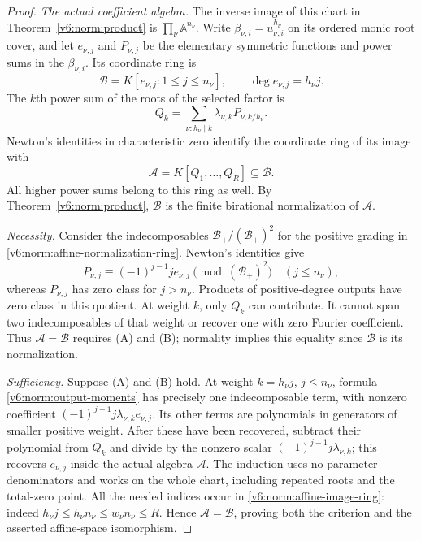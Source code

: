 \documentclass[10pt,fleqn]{article}
\numberwithin{equation}{section}
\newcommand{\A}{\mathbb A}
\begin{document}
\begin{proof}
\emph{The actual coefficient algebra.}
The inverse image of this chart in
Theorem~\ref{v6:norm:product} is $\prod_\nu\A^{n_\nu}$.  Write
$\beta_{\nu,i}=u_{\nu,i}^{h_\nu}$ on its ordered monic root cover,
and let $e_{\nu,j}$ and $P_{\nu,j}$ be the elementary symmetric
functions and power sums in the $\beta_{\nu,i}$.  Its coordinate
ring is
\begin{equation}\label{v6:norm:affine-normalization-ring}
 \mathcal B=K[e_{\nu,j}:1\le j\le n_\nu],
 \qquad \deg e_{\nu,j}=h_\nu j.
\end{equation}
The $k$th power sum of the roots of the selected factor is
\begin{equation}\label{v6:norm:output-moments}
 Q_k=\sum_{\nu:h_\nu\mid k}
       \lambda_{\nu,k}P_{\nu,k/h_\nu}.
\end{equation}
Newton's identities in characteristic zero identify the coordinate
ring of its image with
\begin{equation}\label{v6:norm:affine-image-ring}
 \mathcal A=K[Q_1,\ldots,Q_R]\subseteq\mathcal B.
\end{equation}
All higher power sums belong to this ring as well.  By
Theorem~\ref{v6:norm:product}, $\mathcal B$ is the finite
birational normalization of $\mathcal A$.

\emph{Necessity.}
Consider the indecomposables
$\mathcal B_+/(\mathcal B_+)^2$ for the positive grading in
\eqref{v6:norm:affine-normalization-ring}.  Newton's identities give
\[
 P_{\nu,j}\equiv(-1)^{j-1}j e_{\nu,j}
       \pmod{(\mathcal B_+)^2}\quad(j\le n_\nu),
\]
whereas $P_{\nu,j}$ has zero class for $j>n_\nu$.
Products of positive-degree outputs have zero class in this quotient.
At weight $k$, only $Q_k$ can contribute.  It cannot span two
indecomposables of that weight or recover one with zero Fourier
coefficient.  Thus $\mathcal A=\mathcal B$ requires (A) and (B);
normality implies this equality since $\mathcal B$ is its normalization.

\emph{Sufficiency.}
Suppose (A) and (B) hold.  At weight $k=h_\nu j$,
$j\le n_\nu$, formula \eqref{v6:norm:output-moments} has precisely
one indecomposable term, with nonzero coefficient
$(-1)^{j-1}j\lambda_{\nu,k}e_{\nu,j}$.  Its other terms are
polynomials in generators of smaller positive weight.  After these
have been recovered, subtract their polynomial from $Q_k$ and divide
by the nonzero scalar $(-1)^{j-1}j\lambda_{\nu,k}$; this recovers
$e_{\nu,j}$ inside the actual algebra $\mathcal A$.  The induction
uses no parameter denominators and works on the whole chart,
including repeated roots and the total-zero point.
All the needed indices occur in \eqref{v6:norm:affine-image-ring}:
indeed $h_\nu j\le h_\nu n_\nu\le w_\nu n_\nu\le R$.
Hence $\mathcal A=\mathcal B$, proving both the criterion and the
asserted affine-space isomorphism.
\end{proof}
\end{document}
